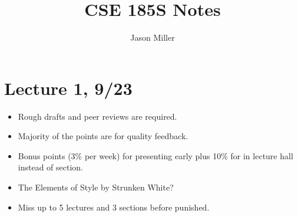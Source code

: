 \documentclass[12pt]{article}
\begin{document}
\title{CSE 185S Notes}
\author{Jason Miller}
\maketitle 

\tableofcontents

\newpage 
\section{Lecture 1, 9/23}
\begin{itemize}
\item Rough drafts and peer reviews are required. 
\item Majority of the points are for quality feedback. 
\item Bonus points (3\% per week) for presenting early plus 10\% for in lecture hall instead of section.
\item The Elements of Style by Strunken White?
\item Miss up to 5 lectures and 3 sections before punished. 
\end{itemize}
\end{document}
